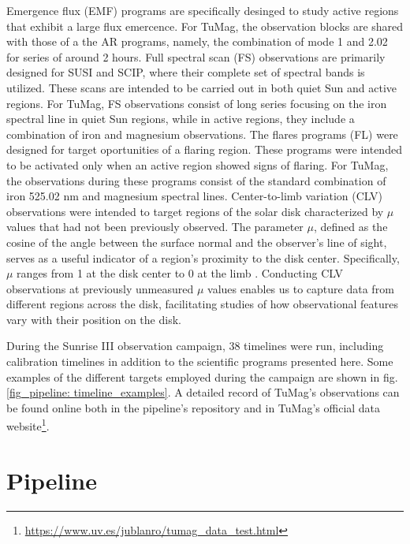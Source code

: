 \begin{itemize}
  \Myitem Emergence flux (EMF) programs are specifically desinged to study active regions that exhibit a large flux emercence. For TuMag, the observation blocks are shared with those of a the AR programs, namely, the combination of mode 1 and 2.02 for series of around 2 hours. 
  \Myitem Full spectral scan (FS) observations are primarily designed for SUSI and SCIP, where their complete set of spectral bands is utilized. These scans are intended to be carried out in both quiet Sun and active regions. For TuMag, FS observations consist of long series focusing on the iron spectral line in quiet Sun regions, while in active regions, they include a combination of iron and magnesium observations.
  \Myitem The flares programs (FL) were designed for target oportunities of a flaring region. These programs were intended to be activated only when an active region showed signs of flaring. For TuMag, the observations during these programs consist of the standard combination of iron 525.02 nm and magnesium spectral lines.
  \Myitem Center-to-limb variation (CLV) observations were intended to target regions of the solar disk characterized by $\mu$ values that had not been previously observed. The parameter $\mu$, defined as the cosine of the angle between the surface normal and the observer's line of sight, serves as a useful indicator of a region's proximity to the disk center. Specifically, $\mu$ ranges from 1 at the disk center to 0 at the limb \citep{thompson2006coordinate}. Conducting CLV observations at previously unmeasured $\mu$ values enables us to capture data from different regions across the disk, facilitating studies of how observational features vary with their position on the disk. 
\end{itemize}

During the Sunrise III observation campaign, 38 timelines were run, including calibration timelines in addition to the scientific programs presented here. Some examples of the different targets employed during the campaign are shown in fig. \ref{fig_pipeline: timeline_examples}.  A detailed record of TuMag's observations can be found online both in the pipeline's repository and in TuMag's official data website\footnote{\url{https://www.uv.es/jublanro/tumag_data_test.html}}.  

\section{Pipeline}

